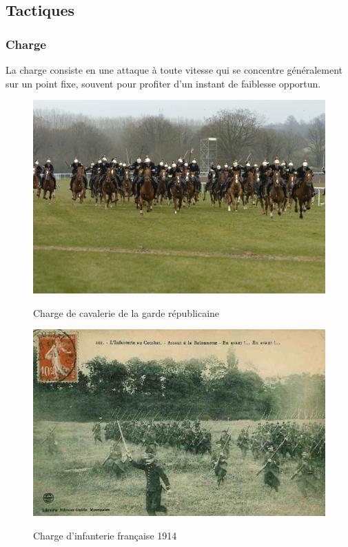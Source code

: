 \documentclass{article}
\begin{document}
\subsection{Tactiques}

\subsubsection{Charge}
La charge consiste en une attaque à toute vitesse qui se concentre généralement sur un point fixe, souvent pour profiter d'un instant de faiblesse opportun. 

\begin{center}
\begin{figure}[H]
\hfill
\begin{minipage}[H]{0.5\linewidth}
	\centering
	\includegraphics[width=\linewidth]{../ressources/Charge-de-cavalerie}
	\caption{Charge de cavalerie de la garde républicaine \cite{charge_cavalery}}
\end{minipage}
\hfill
\begin{minipage}[H]{0.45\linewidth}
	\centering
	\includegraphics[width=\linewidth]{../ressources/charge_infanterie}
	\caption{Charge d’infanterie française 1914 \cite{infantery_charge}}
	\cite{charge_tactic}
\end{minipage}
\hfill
\end{figure}
\end{center}
\end{document}
